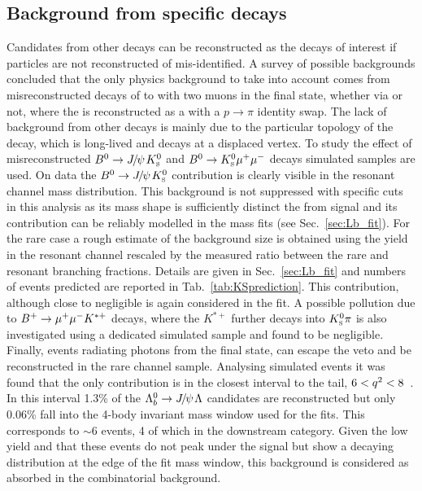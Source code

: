 \subsection{Background from specific decays}

Candidates from other decays can be reconstructed as the decays of interest if
particles are not reconstructed of mis-identified.
A survey of possible backgrounds concluded that the only physics background
to take into account comes from misreconstructed decays of \Bz to \KS with
two muons in the final state, whether via \jpsi or not, where the \KS is reconstructed 
as a \Lz with a $p\rightarrow \pi$ identity swap.
The lack of background from other decays is
mainly due to the particular topology of the \Lz decay, which is long-lived and decays at a displaced vertex.
To study the effect of misreconstructed $\Bz\ra\jpsi\KS$ and ${{B}^0}\rightarrow{\ensuremath{{K}^0_{\rm\scriptscriptstyle S}}}{\ensuremath{\mu^+\mu^-}}$ decays
simulated samples are used. On data the $\Bz\ra\jpsi\KS$ contribution is clearly visible in the resonant channel mass distribution.
This background is not suppressed with specific cuts in this analysis as its mass shape is sufficiently distinct
the from \Lb signal and its contribution can be reliably modelled in the mass fits (see Sec.~\ref{sec:Lb_fit}).
For the rare case a rough estimate of the \KS background size is obtained using the yield in the resonant channel
rescaled by the measured ratio between the rare and resonant branching fractions.
Details are given in Sec.~\ref{sec:Lb_fit} and numbers of events predicted are reported in Tab.~\ref{tab:KSprediction}.
This contribution, although close to negligible is again considered in the fit.
A possible pollution due to $B^{+} \rightarrow{\ensuremath{\mu^+\mu^-}} K^{*+}$ decays, where the $K^{*+}$
further decays into $\KS\pi$ is also investigated using a dedicated simulated sample and found to be negligible.
Finally, \Lb\ra\jpsi\Lz events radiating photons from the final state, can escape the \jpsi veto
and be reconstructed in the rare channel sample. Analysing simulated events it was found that the only
contribution is in the closest \qsq interval to the \jpsi tail, $6 < {q^2} < 8$~\gevgevcccc.
In this interval 1.3\% of the $\Lb\to\jpsi\Lz$ candidates are reconstructed but only 0.06\%
fall into the 4-body invariant mass window used for the fits. This corresponds to $\sim 6$
events, 4 of which in the downstream category. Given the low yield and that these events do
not peak under the signal but show a decaying distribution at the edge of the fit mass window, this
background is considered as absorbed in the combinatorial background.
